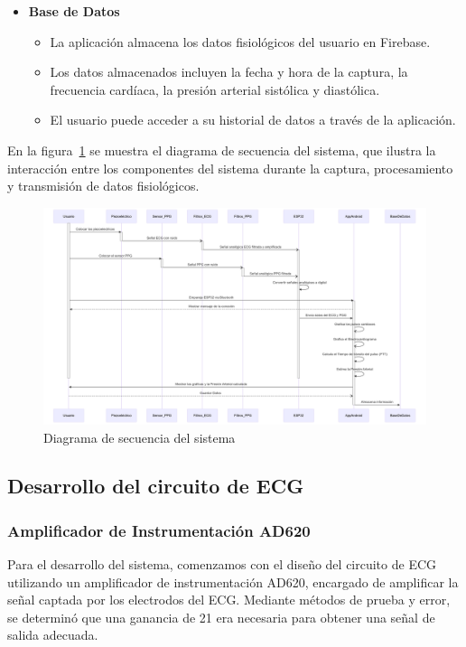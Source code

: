 \begin{enumerate}
\begin{itemize}
                \item \textbf{Base de Datos}
                    \begin{itemize}
                        \item La aplicación almacena los datos fisiológicos del usuario en Firebase.
                        \item Los datos almacenados incluyen la fecha y hora de la captura, la frecuencia cardíaca, la presión arterial sistólica y diastólica.
                        \item El usuario puede acceder a su historial de datos a través de la aplicación.
                    \end{itemize}
            \end{itemize}
    \end{enumerate}

    En la figura~\ref{fig:Diagrama_Secuencia} se muestra el diagrama de secuencia del sistema, que ilustra la interacción entre los componentes del sistema durante la captura, procesamiento y transmisión de datos fisiológicos.

    \begin{figure}[H]
        \centering
        \includegraphics[width=1\textwidth]{img/Desarrollo/diagrama_secuencia.png}
        \caption{Diagrama de secuencia del sistema}
        \label{fig:Diagrama_Secuencia}
    \end{figure}

    \subsection{Desarrollo del circuito de ECG}
        \subsubsection{Amplificador de Instrumentación AD620}
        Para el desarrollo del sistema, comenzamos con el diseño del circuito de ECG utilizando un amplificador de instrumentación AD620, encargado de amplificar la señal captada por los electrodos del ECG. Mediante métodos de prueba y error, se determinó que una ganancia de 21 era necesaria para obtener una señal de salida adecuada.

